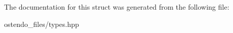 The documentation for this struct was generated from the following file\+:\begin{DoxyCompactItemize}
\item 
ostendo\+\_\+files/types.\+hpp\end{DoxyCompactItemize}
